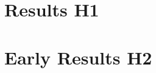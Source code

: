 \documentclass{article}
\begin{document}
\section{Results H1}\label{sec:ResultsH1}



\section{Early Results H2}





\end{document}
